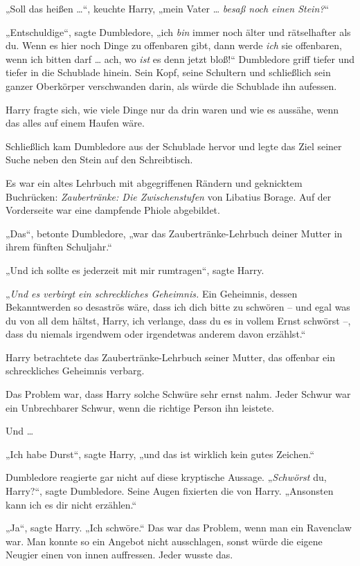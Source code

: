 {„Soll das heißen …“, keuchte Harry, „mein Vater … \emph{besaß noch einen Stein?}“

„Entschuldige“, sagte Dumbledore, „ich \emph{bin} immer noch älter und rätselhafter als du. Wenn es hier noch Dinge zu offenbaren gibt, dann werde \emph{ich} sie offenbaren, wenn ich bitten darf … ach, wo \emph{ist} es denn jetzt bloß!“ Dumbledore griff tiefer und tiefer in die Schublade hinein. Sein Kopf, seine Schultern und schließlich sein ganzer Oberkörper verschwanden darin, als würde die Schublade ihn aufessen.

Harry fragte sich, wie viele Dinge nur da drin waren und wie es aussähe, wenn das alles auf einem Haufen wäre.

Schließlich kam Dumbledore aus der Schublade hervor und legte das Ziel seiner Suche neben den Stein auf den Schreibtisch.

Es war ein altes Lehrbuch mit abgegriffenen Rändern und geknicktem Buchrücken: \emph{Zaubertränke: Die Zwischenstufen} von Libatius Borage. Auf der Vorderseite war eine dampfende Phiole abgebildet.

„Das“, betonte Dumbledore, „war das Zaubertränke-Lehrbuch deiner Mutter in ihrem fünften Schuljahr.“

„Und ich sollte es jederzeit mit mir rumtragen“, sagte Harry.

„\emph{Und es verbirgt ein schreckliches Geheimnis.} Ein Geheimnis, dessen Bekanntwerden so desaströs wäre, dass ich dich bitte zu schwören -- und egal was du von all dem hältst, Harry, ich verlange, dass du es in vollem Ernst schwörst --, dass du niemals irgendwem oder irgendetwas anderem davon erzählst.“

Harry betrachtete das Zaubertränke-Lehrbuch seiner Mutter, das offenbar ein schreckliches Geheimnis verbarg.

Das Problem war, dass Harry solche Schwüre sehr ernst nahm. Jeder Schwur war ein Unbrechbarer Schwur, wenn die richtige Person ihn leistete.

Und …

„Ich habe Durst“, sagte Harry, „und das ist wirklich kein gutes Zeichen.“

Dumbledore reagierte gar nicht auf diese kryptische Aussage. „\emph{Schwörst} du, Harry?“, sagte Dumbledore. Seine Augen fixierten die von Harry. „Ansonsten kann ich es dir nicht erzählen.“

„Ja“, sagte Harry. „Ich schwöre.“ Das war das Problem, wenn man ein Ravenclaw war. Man konnte so ein Angebot nicht ausschlagen, sonst würde die eigene Neugier einen von innen auffressen. Jeder wusste das.

}
